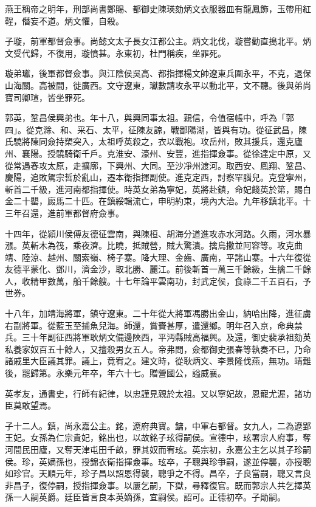 \begin{pinyinscope}
燕王稱帝之明年，刑部尚書鄭賜、都御史陳瑛劾炳文衣服器皿有龍鳳飾，玉帶用紅鞓，僭妄不道。炳文懼，自殺。

子璇，前軍都督僉事。尚懿文太子長女江都公主。炳文北伐，璇嘗勸直搗北平。炳文受代歸，不復用，璇憤甚。永東初，杜門稱疾，坐罪死。

璇弟瓛，後軍都督僉事。與江陰侯吳高、都指揮楊文帥遼東兵圍永平，不克，退保山海關。高被間，徙廣西。文守遼東，瓛數請攻永平以動北平，文不聽。後與弟尚寶司卿瑄，皆坐罪死。

郭英，鞏昌侯興弟也。年十八，與興同事太祖。親信，令值宿帳中，呼為「郭四」。從克滁、和、采石、太平，征陳友諒，戰鄱陽湖，皆與有功。從征武昌，陳氏驍將陳同僉持槊突入，太祖呼英殺之，衣以戰袍。攻岳州，敗其援兵，還克廬州、襄陽。授驍騎衛千戶。克淮安、濠州、安豐，進指揮僉事。從徐達定中原，又從常遇春攻太原，走擴廓，下興州、大同。至沙凈州渡河。取西安、鳳翔、鞏昌、慶陽，追敗駕宗哲於亂山，遷本衛指揮副使。進克定西，討察罕腦兒。克登寧州，斬首二千級，進河南都指揮使。時英女弟為寧妃，英將赴鎮，命妃餞英於第，賜白金二十罌，廄馬二十匹。在鎮綏輯流亡，申明約束，境內大治。九年移鎮北平。十三年召還，進前軍都督府僉事。

十四年，從潁川侯傅友德征雲南，與陳桓、胡海分道進攻赤水河路。久雨，河水暴漲。英斬木為筏，乘夜濟。比曉，抵賊營，賊大驚潰。擒烏撒並阿容等。攻克曲靖、陸涼、越州、關索嶺、椅子寨。降大理、金齒、廣南，平諸山寨。十六年復從友德平蒙化、鄧川，濟金沙，取北勝、麗江。前後斬首一萬三千餘級，生擒二千餘人，收精甲數萬，船千餘艘。十七年論平雲南功，封武定侯，食祿二千五百石，予世券。

十八年，加靖海將軍，鎮守遼東。二十年從大將軍馮勝出金山，納哈出降，進征虜右副將軍。從藍玉至捕魚兒海。師還，賞賚甚厚，遣還鄉。明年召入京，命典禁兵。三十年副征西將軍耿炳文備邊陜西，平沔縣賊高福興。及還，御史裴承祖劾英私養家奴百五十餘人，又擅殺男女五人。帝弗問，僉都御史張春等執奏不已，乃命諸戚里大臣議其罪。議上，竟宥之。建文時，從耿炳文、李景隆伐燕，無功。靖難後，罷歸第。永樂元年卒，年六十七。贈營國公，謚威襄。

英孝友，通書史，行師有紀律，以忠謹見親於太祖。又以寧妃故，恩寵尤渥，諸功臣莫敢望焉。

子十二人。鎮，尚永嘉公主。銘，遼府典寶。鏞，中軍右都督。女九人，二為遼郢王妃。女孫為仁宗貴妃，銘出也，以故銘子玹得嗣侯。宣德中，玹署宗人府事，奪河間民田廬，又奪天津屯田千畝，罪其奴而宥玹。英宗初，永嘉公主乞以其子珍嗣侯。珍，英嫡孫也，授錦衣衛指揮僉事。玹卒，子聰與珍爭嗣，遂並停襲，亦授聰如珍官。天順元年，珍子昌以詔恩得襲，聰爭之不得。昌卒，子良當嗣，聰又言良非昌子，復停嗣，授指揮僉事。以屢乞嗣，下獄，尋釋復官。既而郭宗人共乞擇英孫一人嗣英爵。廷臣皆言良本英嫡孫，宜嗣侯。詔可。正德初卒。子勛嗣。


\end{pinyinscope}

